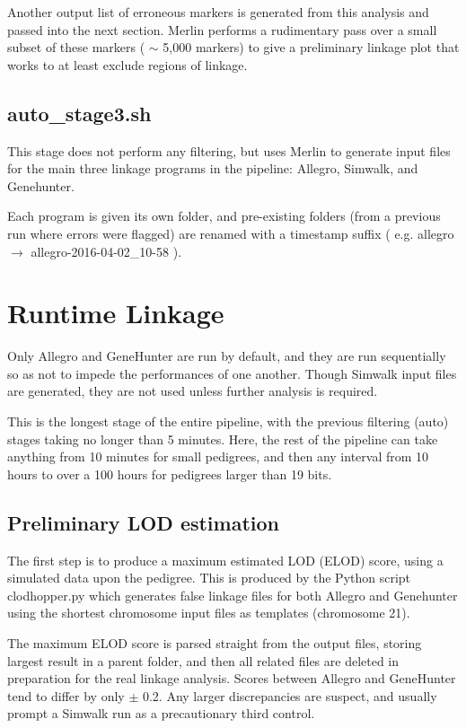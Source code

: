 Another output list of erroneous markers is generated from this analysis and passed into the next section. Merlin performs a rudimentary pass over a small subset of these markers ( $\sim$ 5,000 markers) to give a preliminary linkage plot that works to at least exclude regions of linkage.

\subsection{auto\_stage3.sh}

This stage does not perform any filtering, but uses Merlin to generate input files for the main three linkage programs in the pipeline: \gls{Allegro}, \gls{Simwalk}, and \gls{Genehunter}.

Each program is given its own folder, and pre-existing folders (from a previous run where errors were flagged) are renamed with a timestamp suffix ( e.g. allegro \(\rightarrow\) allegro-2016-04-02\_10-58 ).


\section{Runtime Linkage}

Only Allegro and GeneHunter are run by default, and they are run sequentially so as not to impede the performances of one another. Though Simwalk input files are generated, they are not used unless further analysis is required.

This is the longest stage of the entire pipeline, with the previous filtering (auto) stages taking no longer than 5 minutes. Here, the rest of the pipeline can take anything from 10 minutes for small pedigrees, and then any interval from 10 hours to over a 100 hours for pedigrees larger than 19 bits.

\subsection{Preliminary LOD estimation}

The first step is to produce a maximum estimated LOD (\gls{ELOD}) score, using a simulated data upon the pedigree.  This is produced by the \gls{Python} script \gls{clodhopper.py} which generates false linkage files for both Allegro and Genehunter using the shortest chromosome input files as templates (chromosome 21).

The maximum ELOD score is parsed straight from the output files, storing largest result in a parent folder, and then all related files are deleted in preparation for the real linkage analysis. Scores between Allegro and GeneHunter tend to differ by only $\pm$ 0.2. Any larger discrepancies are suspect, and usually prompt a Simwalk run as a precautionary third control.

